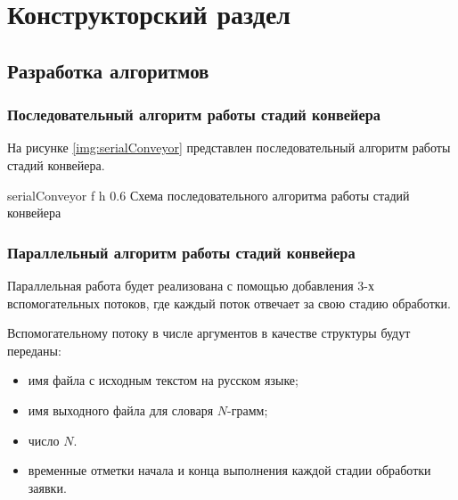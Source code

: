 \chapter{Конструкторский раздел}

\section{Разработка алгоритмов}

\subsection{Последовательный алгоритм работы стадий конвейера}

На рисунке \ref{img:serialConveyor} представлен последовательный алгоритм работы стадий
конвейера.

{serialConveyor} %
{f} %
{h} %
{0.6\textwidth} %
{Схема последовательного алгоритма работы стадий конвейера} %
%

\clearpage

\subsection{Параллельный алгоритм работы стадий конвейера}
Параллельная работа будет реализована с помощью добавления 3-х вспомогательных потоков, где каждый поток отвечает за свою стадию обработки.

Вспомогательному потоку в числе аргументов в качестве структуры будут переданы:

\begin{itemize}[label*=--]
	\item имя файла с исходным текстом на русском языке;
	\item имя выходного файла для словаря $N$-грамм;
	\item число $N$.
	\item временные отметки начала и конца выполнения каждой стадии обработки заявки.
\end{itemize}

